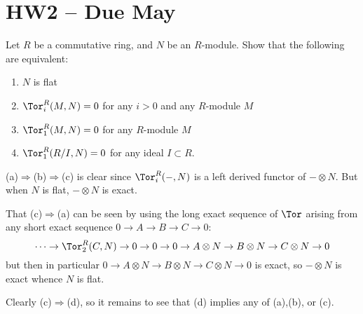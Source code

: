 \documentclass[12pt]{article}
\begin{document}

\newpage
\section{HW2 -- Due May}
\begin{prob}
	Let $R$ be a commutative ring, and $N$ be an $R$-module. Show that the following are equivalent:
	\begin{enumerate}
		\item $N$ is flat 
		\item $\Tor_i^R(M,N) = 0$ for any $i>0$ and any $R$-module $M$
		\item $\Tor_1^R(M,N) = 0$ for any $R$-module $M$
		\item $\Tor_1^R(R/I, N) = 0$ for any ideal $I \subset R$.
	\end{enumerate}
\end{prob}
\begin{sol}
	(a)$\Rightarrow$(b)$\Rightarrow$(c) is clear since $\Tor_i^R(-,N)$ is a left derived functor of $-\otimes N$. But when $N$ is flat, $-\otimes N$ is exact.

	That (c)$\Rightarrow$(a) can be seen by using the long exact sequence of $\Tor$ arising from any short exact sequence $0\to A\to B\to C\to 0$:
	\[\cdots\to\Tor_2^R(C,N)\to 0\to 0\to 0\to A\otimes N\to B\otimes N\to C\otimes N\to 0\]
	but then in particular $0\to A\otimes N\to B\otimes N\to C\otimes N\to 0$ is exact, so $-\otimes N$ is exact whence $N$ is flat.

	Clearly (c)$\Rightarrow$(d), so it remains to see that (d) implies any of (a),(b), or (c).

\end{sol}
\end{document}
